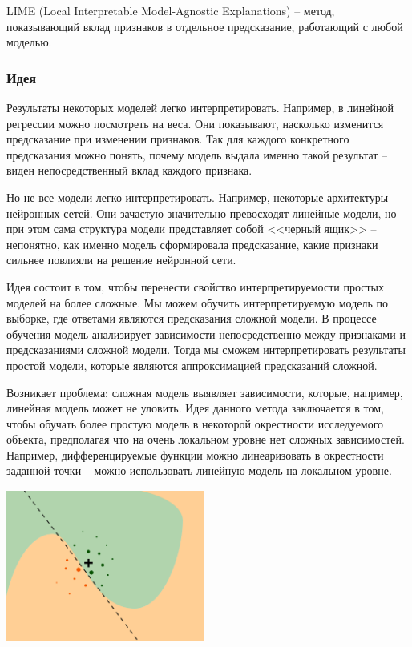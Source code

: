 LIME (Local Interpretable Model-Agnostic Explanations) -- метод, показывающий вклад признаков в отдельное предсказание, работающий с любой моделью.

\subsubsection{Идея}
Результаты некоторых моделей легко интерпретировать. Например, в линейной регрессии можно посмотреть на веса. Они показывают, насколько изменится предсказание при изменении признаков. Так для каждого конкретного предсказания можно понять, почему модель выдала именно такой результат -- виден непосредственный вклад каждого признака.

Но не все модели легко интерпретировать. Например, некоторые архитектуры нейронных сетей. Они зачастую значительно превосходят линейные модели, но при этом сама структура модели представляет собой <<черный ящик>> -- непонятно, как именно модель сформировала предсказание, какие признаки сильнее повлияли на решение нейронной сети.

Идея состоит в том, чтобы перенести свойство интерпретируемости простых моделей на более сложные. Мы можем обучить интерпретируемую модель по выборке, где ответами являются предсказания сложной модели. В процессе обучения модель анализирует зависимости непосредственно между признаками и предсказаниями сложной модели. Тогда мы сможем интерпретировать результаты простой модели, которые являются аппроксимацией предсказаний сложной.\\[2mm]
\begin{minipage}{0.57\linewidth}
\indent Возникает проблема: сложная модель выявляет зависимости, которые, например, линейная модель может не уловить. Идея данного метода заключается в том, чтобы обучать более простую модель в некоторой окрестности исследуемого объекта, предполагая что на очень локальном уровне нет сложных зависимостей. Например, дифференцируемые функции можно линеаризовать в окрестности заданной точки -- можно использовать линейную модель на локальном уровне.
\end{minipage}
\hspace{5mm}
\begin{minipage}{0.35\linewidth}
	\includegraphics[width=6.5cm, height=5cm]{pics/lime4.png}
\end{minipage}

